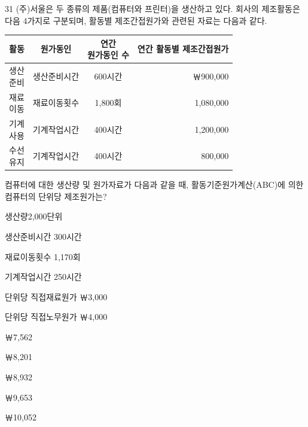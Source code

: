 \begin{question}{31}
(주)서울은 두 종류의 제품(컴퓨터와 프린터)을 생산하고 있다. 회사의 제조활동은 다음 4가지로 구분되며, 활동별 제조간접원가와 관련된 자료는 다음과 같다.

{\small\centering
\begin{tabular}{|c|c|c|r|}
\hline
활동 & 원가동인 & \makecell{연간\\원가동인 수} & \multicolumn{1}{c|}{연간 활동별 제조간접원가} \\
\hline
\makecell{생산\\준비} & 생산준비시간 & 600시간 & ￦900,000 \\
\hline
\makecell{재료\\이동} & 재료이동횟수 & 1,800회 & 1,080,000 \\
\hline
\makecell{기계\\사용} & 기계작업시간 & 400시간 & 1,200,000 \\
\hline
\makecell{수선\\유지} & 기계작업시간 & 400시간 & 800,000 \\
\hline
\end{tabular}\par}

컴퓨터에 대한 생산량 및 원가자료가 다음과 같을 때, 활동기준원가계산(ABC)에 의한 컴퓨터의 단위당 제조원가는? \par
생산량2,000단위 \par
생산준비시간 300시간 \par
재료이동횟수 1,170회 \par
기계작업시간 250시간 \par
단위당 직접재료원가 ￦3,000 \par
단위당 직접노무원가 ￦4,000 \par
\begin{choices}
  \item ￦7,562
  \item ￦8,201
  \item ￦8,932
  \item ￦9,653
  \item ￦10,052
\end{choices}
\end{question}
